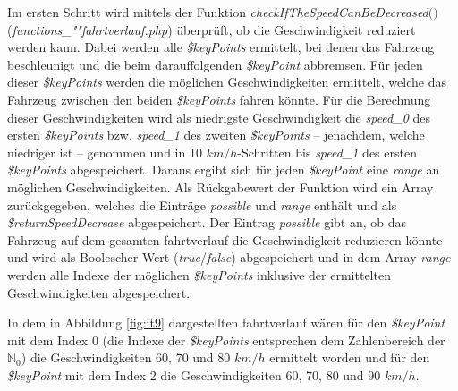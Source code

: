 Im ersten Schritt wird mittels der Funktion \textit{check\-If\-The\-Speed\-Can\-Be\-De\-creased$($$)$} (\textit{func\-tions\_""fahrt\-ver\-lauf\-.php}) überprüft, ob die Geschwindigkeit reduziert werden kann. Dabei werden alle \textit{\$keyPoints} ermittelt, bei denen das Fahrzeug beschleunigt und die beim darauffolgenden \textit{\$keyPoint} abbremsen. Für jeden dieser \textit{\$keyPoints} werden die möglichen Geschwindigkeiten ermittelt, welche das Fahrzeug zwischen den beiden \textit{\$keyPoints} fahren könnte. Für die Berechnung dieser Geschwindigkeiten wird als niedrigste Geschwindigkeit die \textit{speed\_0} des ersten \textit{\$keyPoints} bzw. \textit{speed\_1} des zweiten \textit{\$keyPoints} -- jenachdem, welche niedriger ist -- genommen und in 10 $km/h$-Schritten bis  \textit{speed\_1} des ersten \textit{\$keyPoints} abgespeichert. Daraus ergibt sich für jeden \textit{\$keyPoint} eine \textit{range} an möglichen Geschwindigkeiten. Als Rückgabewert der Funktion wird ein Array zurückgegeben, welches die Einträge \textit{possible} und \textit{range} enthält und als \textit{\$return\-Speed\-Decrease} abgespeichert. Der Eintrag \textit{possible} gibt an, ob das Fahrzeug auf dem gesamten \Gls{fahrtverlauf} die Geschwindigkeit reduzieren könnte und wird als Boolescher Wert (\textit{true}/\textit{false}) abgespeichert und in dem Array \textit{range} werden alle Indexe der möglichen \textit{\$keyPoints} inklusive der ermittelten Geschwindigkeiten abgespeichert.

In dem in Abbildung \ref{fig:it9} dargestellten \Gls{fahrtverlauf} wären für den \textit{\$keyPoint} mit dem Index 0 (die Indexe der \textit{\$keyPoints} entsprechen dem Zahlenbereich der $\mathbb{N}_0$) die Geschwindigkeiten 60, 70 und 80 $km/h$ ermittelt worden und für den \textit{\$keyPoint} mit dem Index 2 die Geschwindigkeiten 60, 70, 80 und 90 $km/h$.


